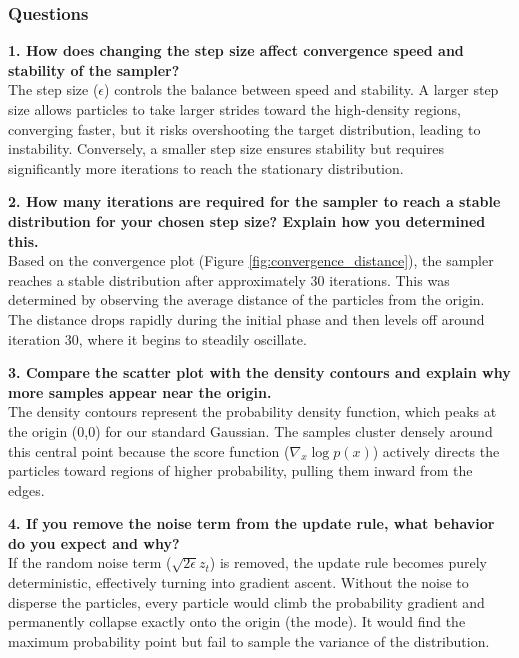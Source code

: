 \documentclass[a4paper,12pt]{extarticle}
\begin{document}
\subsubsection*{Questions}
\textbf{1. How does changing the step size affect convergence speed and stability of the sampler?} \\
The step size ($\epsilon$) controls the balance between speed and stability. A larger step size allows particles to take larger strides toward the high-density regions, converging faster, but it risks overshooting the target distribution, leading to instability. Conversely, a smaller step size ensures stability but requires significantly more iterations to reach the stationary distribution.

\vspace{0.3cm}
\textbf{2. How many iterations are required for the sampler to reach a stable distribution for your chosen step size? Explain how you determined this.} \\
Based on the convergence plot (Figure \ref{fig:convergence_distance}), the sampler reaches a stable distribution after approximately 30 iterations. This was determined by observing the average distance of the particles from the origin. The distance drops rapidly during the initial phase and then levels off around iteration 30, where it begins to steadily oscillate.

\vspace{0.3cm}
\textbf{3. Compare the scatter plot with the density contours and explain why more samples appear near the origin.} \\
The density contours represent the probability density function, which peaks at the origin (0,0) for our standard Gaussian. The samples cluster densely around this central point because the score function ($\nabla_{x}\log p(x)$) actively directs the particles toward regions of higher probability, pulling them inward from the edges.

\vspace{0.3cm}
\textbf{4. If you remove the noise term from the update rule, what behavior do you expect and why?} \\
If the random noise term ($\sqrt{2\epsilon}z_{t}$) is removed, the update rule becomes purely deterministic, effectively turning into gradient ascent. Without the noise to disperse the particles, every particle would climb the probability gradient and permanently collapse exactly onto the origin (the mode). It would find the maximum probability point but fail to sample the variance of the distribution.
\end{document}
